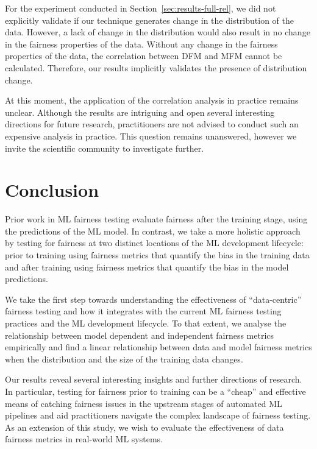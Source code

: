 \documentclass[conference]{IEEEtran}
\begin{document}
For the experiment conducted in Section~\ref{sec:results-full-rel}, we
did not explicitly validate if our technique generates change in the
distribution of the data. However, a lack of change in the
distribution would also result in no change in the fairness properties
of the data. Without any change in the fairness properties of the
data, the correlation between DFM and MFM cannot be
calculated. Therefore, our results implicitly validates the presence
of distribution change.

At this moment, the application of the correlation analysis in
practice remains unclear. Although the results are intriguing and open
several interesting directions for future research, practitioners are
not advised to conduct such an expensive analysis in practice. This
question remains unanswered, however we invite the scientific
community to investigate further.

\section{Conclusion}

Prior work in ML fairness testing evaluate fairness after the training
stage, using the predictions of the ML model. In contrast, we take a
more holistic approach by testing for fairness at two distinct
locations of the ML development lifecycle: prior to training using
fairness metrics that quantify the bias in the training data and after
training using fairness metrics that quantify the bias in the model
predictions.

We take the first step towards understanding the effectiveness of
``data-centric'' fairness testing and how it integrates with the
current ML fairness testing practices and the ML development
lifecycle. To that extent, we analyse the relationship between model
dependent and independent fairness metrics empirically and find a
linear relationship between data and model fairness metrics when the
distribution and the size of the training data changes.

Our results reveal several interesting insights and further directions
of research. In particular, testing for fairness prior to training can
be a ``cheap'' and effective means of catching fairness issues in the
upstream stages of automated ML pipelines and aid practitioners
navigate the complex landscape of fairness testing. As an extension of
this study, we wish to evaluate the effectiveness of data fairness
metrics in real-world ML systems.
\end{document}
